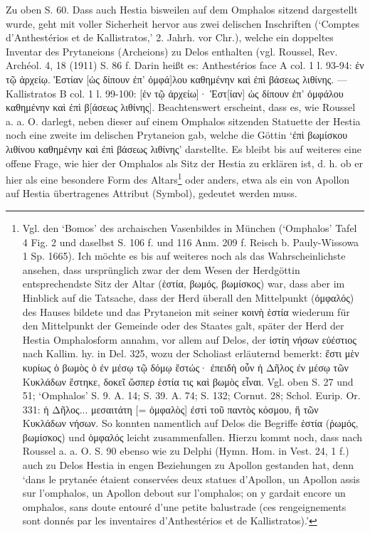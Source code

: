 \documentclass[a4paper, 11pt, oneside]{article}
\begin{document}
Zu oben S. 60. Dass auch Hestia bisweilen auf dem Omphalos sitzend dargestellt wurde, geht mit voller Sicherheit hervor aus zwei delischen Inschriften (`Comptes d'Anthestérios et de Kallistratos,' 2. Jahrh. vor Chr.), welche ein doppeltes Inventar des Prytaneions (Archeions) zu Delos enthalten (vgl. Roussel, Rev. Archéol. 4, 18 (1911) S. 86 f. Darin heißt es: Anthestérios face A col. 1 l. 93-94: ἐν τῷ ἀρχείῳ. Ἑστίαν [ὡς δίπουν ἐπ' ὀμφά]λου καθημένην καὶ ἐπὶ βάσεως λιθίνης. --- Kallistratos B col. 1 l. 99-100: [ἐν τῷ ἀρχείω]· Ἑστ[ίαν] ὡς δίπουν ἐπ' ὀμφάλου καθημένην καὶ ἐπὶ β[άσεως λιθίνης]. Beachtenswert erscheint, dass es, wie Roussel a. a. O. darlegt, neben dieser auf einem Omphalos sitzenden Statuette der Hestia noch eine zweite im delischen Prytaneion gab, welche die Göttin `ἐπὶ βωμίσκου λιθίνου καθημένην καὶ ἐπὶ βάσεως λιθίνης' darstellte. Es bleibt bis auf weiteres eine offene Frage, wie hier der Omphalos als Sitz der Hestia zu erklären ist, d. h. ob er hier als eine besondere Form des Altars\footnote{Vgl. den `Bomos' des archaischen Vasenbildes in München (`Omphalos' Tafel 4 Fig. 2 und daselbst S. 106 f. und 116 Anm. 209 f. Reisch b. Pauly-Wissowa 1 Sp. 1665). Ich möchte es bis auf weiteres noch als das Wahrscheinlichste ansehen, dass ursprünglich zwar der dem Wesen der Herdgöttin entsprechendste Sitz der Altar (ἑστία, βωμός, βωμίσκος) war, dass aber im Hinblick auf die Tatsache, dass der Herd überall den Mittelpunkt (ὀμφαλός) des Hauses bildete und das Prytaneion mit seiner κοινὴ ἑστία wiederum für den Mittelpunkt der Gemeinde oder des Staates galt, später der Herd der Hestia Omphalosform annahm, vor allem auf Delos, der ἱστίη νήσων εὐέστιος nach Kallim. hy. in Del. 325, wozu der Scholiast erläuternd bemerkt: ἔστι μὲν κυρίως ὁ βωμὸς ὁ ἐν μέσῳ τῷ δόμῳ ἕστώς· ἐπειδὴ οὖν ἡ Δῆλος ἐν μέσῳ τῶν Κυκλάδων ἕστηκε, δοκεῖ ὥσπερ ἑστία τις καὶ βωμὸς εἶναι. Vgl. oben S. 27 und 51; `Omphalos' S. 9. A. 14; S. 39. A. 74; S. 132; Cornut. 28; Schol. Eurip. Or. 331: ἡ Δῆλος... μεσαιτάτη [= ὀμφαλὸς] ἐστὶ τοῦ παντὸς κόσμου, ἢ τῶν Κυκλάδων νήσων. So konnten namentlich auf Delos die Begriffe ἑστία (ῤωμός, βωμίσκος) und ὀμφαλός leicht zusammenfallen. Hierzu kommt noch, dass nach Roussel a. a. O. S. 90 ebenso wie zu Delphi (Hymn. Hom. in Vest. 24, 1 f.) auch zu Delos Hestia in engen Beziehungen zu Apollon gestanden hat, denn `dans le prytanée étaient conservées deux statues d'Apollon, un Apollon assis sur l'omphalos, un Apollon debout sur l'omphalos; on y gardait encore un omphalos, sans doute entouré d'une petite balustrade (ces rengeignements sont donnés par les inventaires d'Anthestérios et de Kallistratos).'} oder anders, etwa als ein von Apollon auf Hestia übertragenes Attribut (Symbol), gedeutet werden muss.
\end{document}
